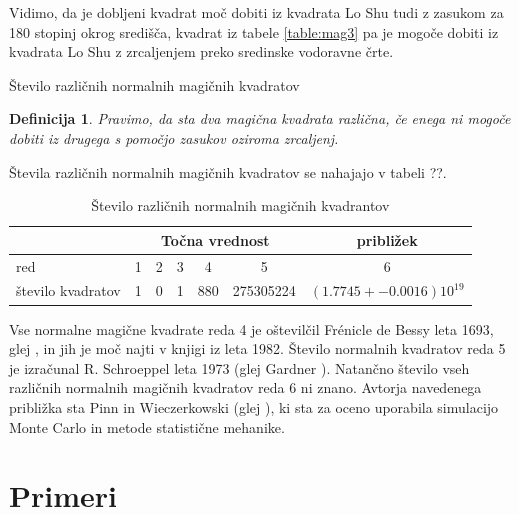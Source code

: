 \documentclass[a4paper,12pt]{article}
\newtheorem{definicija}{Definicija}
\newcommand{\pojem}[1]{\emph{\color{purple}#1}}
\begin{document}
Vidimo, da je dobljeni kvadrat moč dobiti iz kvadrata Lo Shu tudi z zasukom za
180 stopinj okrog središča, kvadrat iz tabele \ref{table:mag3} pa je mogoče dobiti
iz kvadrata Lo Shu z zrcaljenjem preko sredinske vodoravne črte.

Število različnih normalnih magičnih kvadratov

 \begin{definicija}
      Pravimo, da sta dva magična kvadrata \pojem{različna}, če enega ni mogoče dobiti
      iz drugega s pomočjo zasukov oziroma zrcaljenj.
 \end{definicija}

Števila različnih normalnih magičnih kvadratov se nahajajo v tabeli ??.

\begin{table}[htp]
   \centering
   \normalsize
 \caption{Število različnih normalnih magičnih kvadrantov}
 \label{tab:magic-square-6x2}
 \begin{tabular}{lcccccc}
     \hline
     & \multicolumn{5}{c}{Točna vrednost} & približek  \\ %
     \midrule
    red & \large 1 & \large 2 & \large 3 &\large 4 & \large 5 & \large 6\\
    
    število kvadratov & \large 1 & \large 0 & \large 1 & \large 880 & \large 275305224 &\large $(1.7745+-0.0016)10^{19}$\\
     \bottomrule
 \end{tabular}
\end{table}

Vse normalne magične kvadrate reda 4 je oštevilčil Frénicle de Bessy
leta 1693, glej \cite{bessy}, in jih je moč najti v knjigi \cite{berlekamp}
iz leta 1982. Število normalnih kvadratov reda 5 je izračunal
R. Schroeppel leta 1973 (glej Gardner \cite{gardner}).
Natančno število vseh različnih normalnih magičnih kvadratov reda 6 ni znano.
Avtorja navedenega približka sta Pinn in Wieczerkowski (glej \cite{pinn}), ki
sta za oceno uporabila simulacijo Monte Carlo in metode statistične mehanike.


\section{Primeri}
\end{document}
